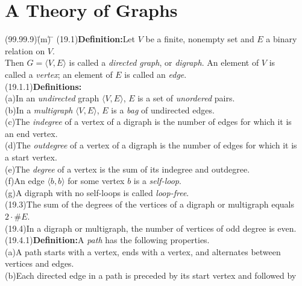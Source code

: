 \documentclass{amsart}
\newcommand{\lgap}{2pt}                             %
\newcommand{\llgap}{6pt}                            %
\begin{document}
\section*{A Theory of Graphs}
\begin{tabbing}
(99.99.9)\;\=(m)\;\= \makebox[2in]{ } \= \kill
(19.1)\>\textbf{Definition:}\quad Let $V$ be a finite, nonempty set and $E$ a binary relation on $V$.\\[\lgap]
      \>Then $G=\langle V,E\rangle$ is called a \emph{directed graph}, or \emph{digraph}. An element of $V$ is\\[\lgap]
      \>called a \emph{vertex}; an element of $E$ is called an \emph{edge}.\\[\llgap]
(19.1.1)\>\textbf{Definitions:}\\[\lgap]
      \>(a)\>In an \emph{undirected} graph $\langle V,E\rangle$, $E$ is a set of \emph{unordered} pairs.\\[\lgap]
      \>(b)\>In a \emph{multigraph} $\langle V,E\rangle$, $E$ is a \emph{bag} of undirected edges.\\[\lgap]
      \>(c)\>The \emph{indegree} of a vertex of a digraph is the number of edges for which it is\\[\lgap]
      \>   \>an end vertex.\\[\lgap]
      \>(d)\>The \emph{outdegree} of a vertex of a digraph is the number of edges for which it is\\[\lgap]
      \>   \>a start vertex.\\[\lgap]
      \>(e)\>The \emph{degree} of a vertex is the sum of its indegree and outdegree.\\[\lgap]
      \>(f)\>An edge $\langle b,b\rangle$ for some vertex $b$ is a \emph{self-loop}.\\[\lgap]
      \>(g)\>A digraph with no self-loops is called \emph{loop-free}.\\[\llgap]
(19.3)\>The sum of the degrees of the vertices of a digraph or multigraph equals $2\cdot\# E$.\\[\lgap]
(19.4)\>In a digraph or multigraph, the number of vertices of odd degree is even.\\[\llgap]
(19.4.1)\>\textbf{Definition:}\quad A \emph{path} has the following properties.\\[\lgap]
      \>(a)\>A path starts with a vertex, ends with a vertex, and alternates between\\[\lgap]
      \>   \>vertices and edges.\\[\lgap]
      \>(b)\>Each directed edge in a path is preceded by its start vertex and followed by\\[\lgap]

\end{tabbing}
\end{document}
